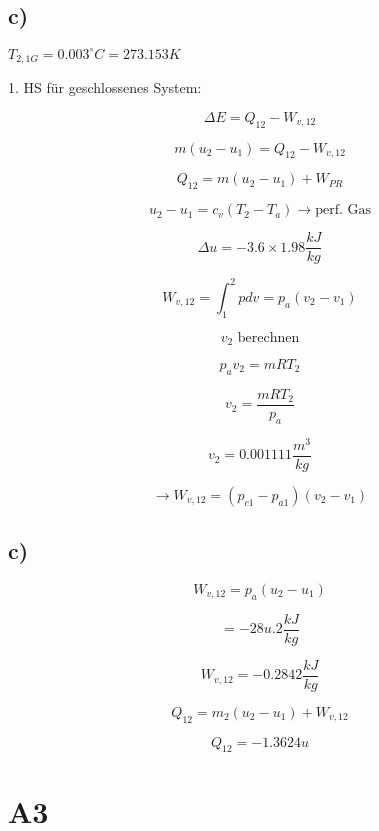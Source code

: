 

\subsection*{c)}
$T_{2,1G} = 0.003^\circ C = 273.153K$

1. HS für geschlossenes System:

\[
\Delta E = Q_{12} - W_{v,12}
\]

\[
m(u_2 - u_1) = Q_{12} - W_{v,12}
\]

\[
Q_{12} = m(u_2 - u_1) + W_{PR}
\]

\[
u_2 - u_1 = c_v (T_2 - T_a) \rightarrow \text{perf. Gas}
\]

\[
\Delta u = -3.6 \times 1.98 \frac{kJ}{kg}
\]

\[
W_{v,12} = \int_{1}^{2} p dv = p_a (v_2 - v_1)
\]

\[
v_2 \text{ berechnen}
\]

\[
p_a v_2 = m R T_2
\]

\[
v_2 = \frac{m R T_2}{p_a}
\]

\[
v_2 = 0.001111 \frac{m^3}{kg}
\]

\[
\rightarrow W_{v,12} = (p_{c1} - p_{a1}) (v_2 - v_1)
\]



\subsection*{c)}
\[
W_{v,12} = p_a (u_2 - u_1)
\]

\[
= -28u.2 \frac{kJ}{kg}
\]

\[
W_{v,12} = -0.2842 \frac{kJ}{kg}
\]

\[
Q_{12} = m_2 (u_2 - u_1) + W_{v,12}
\]

\[
Q_{12} = -1.3624u
\]

\section*{A3}